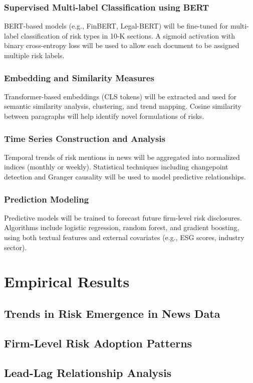 \documentclass[12pt]{report}
\begin{document}
\subsection{Supervised Multi-label Classification using BERT}
BERT-based models (e.g., FinBERT, Legal-BERT) will be fine-tuned for multi-label classification of risk types in 10-K sections. A sigmoid activation with binary cross-entropy loss will be used to allow each document to be assigned multiple risk labels.

\subsection{Embedding and Similarity Measures}
Transformer-based embeddings (CLS tokens) will be extracted and used for semantic similarity analysis, clustering, and trend mapping. Cosine similarity between paragraphs will help identify novel formulations of risks.

\subsection{Time Series Construction and Analysis}
Temporal trends of risk mentions in news will be aggregated into normalized indices (monthly or weekly). Statistical techniques including changepoint detection and Granger causality will be used to model predictive relationships.

\subsection{Prediction Modeling}
Predictive models will be trained to forecast future firm-level risk disclosures. Algorithms include logistic regression, random forest, and gradient boosting, using both textual features and external covariates (e.g., ESG scores, industry sector).

\chapter{Empirical Results}
\section{Trends in Risk Emergence in News Data}
\section{Firm-Level Risk Adoption Patterns}
\section{Lead-Lag Relationship Analysis}
\end{document}

